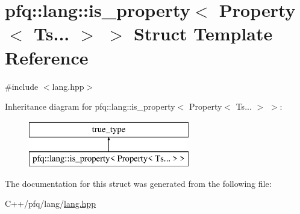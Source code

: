 \hypertarget{structpfq_1_1lang_1_1is__property_3_01Property_3_01Ts_8_8_8_01_4_01_4}{}\section{pfq\+:\+:lang\+:\+:is\+\_\+property$<$ Property$<$ Ts... $>$ $>$ Struct Template Reference}
\label{structpfq_1_1lang_1_1is__property_3_01Property_3_01Ts_8_8_8_01_4_01_4}


{\ttfamily \#include $<$lang.\+hpp$>$}

Inheritance diagram for pfq\+:\+:lang\+:\+:is\+\_\+property$<$ Property$<$ Ts... $>$ $>$\+:\begin{figure}[H]
\begin{center}
\leavevmode
\includegraphics[height=2.000000cm]{structpfq_1_1lang_1_1is__property_3_01Property_3_01Ts_8_8_8_01_4_01_4}
\end{center}
\end{figure}


The documentation for this struct was generated from the following file\+:\begin{DoxyCompactItemize}
\item 
C++/pfq/lang/\hyperlink{lang_8hpp}{lang.\+hpp}\end{DoxyCompactItemize}
